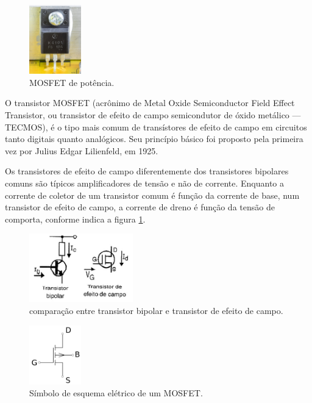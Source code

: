 \documentclass[12pt]{article}
\begin{document}
        \begin{figure}[htpb!]

            \centering
            \includegraphics[width=0.2\textwidth]{./images/Dell_Professional_P2212H_-_power_supply_board_-_K4101FS-2149.jpg}
            \caption{MOSFET de potência.}

        \end{figure}

    O transistor MOSFET (acrônimo de Metal Oxide Semiconductor Field Effect Transistor, ou transistor de efeito de campo semicondutor de óxido metálico — TECMOS), é o tipo mais comum de transístores de efeito de campo em circuitos tanto digitais quanto analógicos. Seu princípio básico foi proposto pela primeira vez por Julius Edgar Lilienfeld, em 1925.

    Os transistores de efeito de campo diferentemente dos transistores bipolares comuns são típicos amplificadores de tensão e não de corrente. Enquanto a corrente de coletor de um transistor comum é função da corrente de base, num transistor de efeito de campo, a corrente de dreno é função da tensão de comporta, conforme indica a figura \ref{fig:comparacao}.

        \begin{figure}[htpb!]

            \centering
            \includegraphics[width=0.4\textwidth]{./images/transisCampo.jpg}
            \caption{comparação entre transistor bipolar e transistor de efeito de campo.}
            \label{fig:comparacao}

        \end{figure}

        \begin{figure}[htpb!]

            \centering
            \includegraphics[width=0.2\textwidth]{./images/Mosfet-wp.svg.png}
            \caption{Símbolo de esquema elétrico de um MOSFET.}

        \end{figure}
\end{document}
